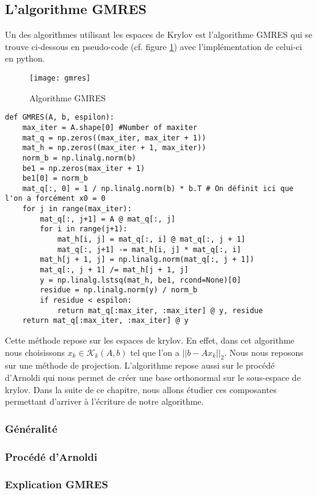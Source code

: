 \subsection{L'algorithme GMRES}
Un des algorithmes utilisant les espaces de Krylov est l'algorithme GMRES qui se trouve ci-dessous en pseudo-code (cf. figure \ref{fig:gmres}) avec l'implémentation de celui-ci en python.
\begin{figure}
	\centering
	\texttt{[image: gmres]}
	\caption{Algorithme GMRES}
	\label{fig:gmres}
\end{figure}
\begin{verbatim}
def GMRES(A, b, espilon):
	max_iter = A.shape[0] #Number of maxiter
	mat_q = np.zeros((max_iter, max_iter + 1))
	mat_h = np.zeros((max_iter + 1, max_iter))
	norm_b = np.linalg.norm(b)
	be1 = np.zeros(max_iter + 1)
	be1[0] = norm_b
	mat_q[:, 0] = 1 / np.linalg.norm(b) * b.T # On définit ici que l'on a forcément x0 = 0
	for j in range(max_iter):
		mat_q[:, j+1] = A @ mat_q[:, j]
		for i in range(j+1):
			mat_h[i, j] = mat_q[:, i] @ mat_q[:, j + 1]
			mat_q[:, j+1] -= mat_h[i, j] * mat_q[:, i]
		mat_h[j + 1, j] = np.linalg.norm(mat_q[:, j + 1])
		mat_q[:, j + 1] /= mat_h[j + 1, j]
		y = np.linalg.lstsq(mat_h, be1, rcond=None)[0]
		residue = np.linalg.norm(y) / norm_b
		if residue < espilon:
			return mat_q[:max_iter, :max_iter] @ y, residue
	return mat_q[:max_iter, :max_iter] @ y
\end{verbatim}

Cette méthode repose sur les espaces de krylov. En effet, dans cet algorithme nous choisissons $x_k \in \mathcal{K}_k(A, b)$ tel que l'on a $||b - Ax_k||_2$. Nous nous reposons sur une méthode de projection. L'algorithme repose aussi sur le procédé d'Arnoldi qui nous permet de créer une base orthonormal sur le sous-espace de krylov. Dans la suite de ce chapitre, nous allons étudier ces composantes permettant d'arriver à l'écriture de notre algorithme.

\subsubsection{Généralité}

\subsubsection{Procédé d'Arnoldi}

\subsubsection{Explication GMRES}